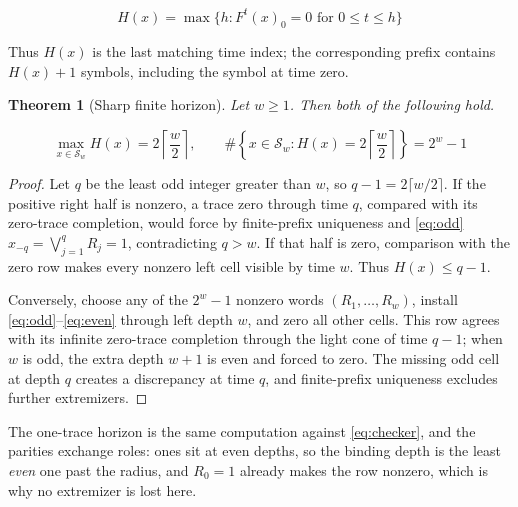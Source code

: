 \documentclass[11pt]{article}
\newtheorem{theorem}{Theorem}
\begin{document}
\begin{equation}\label{eq:horizon}
 H(x)=\max\{h:F^t(x)_0=0\text{ for }0\leq t\leq h\}
\end{equation}

Thus $H(x)$ is the last matching time index; the corresponding prefix contains
$H(x)+1$ symbols, including the symbol at time zero.

\begin{theorem}[Sharp finite horizon]\label{thm:horizon}
Let $w\geq1$.  Then both of the following hold.

\begin{equation}\label{eq:sharp}
 \max_{x\in\mathcal S_w}H(x)=2\left\lceil\frac w2\right\rceil,
 \qquad
 \#\!\left\{x\in\mathcal S_w:H(x)=2\left\lceil\frac w2\right\rceil\right\}
 =2^w-1
\end{equation}
\end{theorem}
\begin{proof}
Let $q$ be the least odd integer greater than $w$, so
$q-1=2\lceil w/2\rceil$.  If the positive right half is nonzero, a trace zero
through time $q$, compared with its zero-trace completion, would force by
finite-prefix uniqueness and \eqref{eq:odd}
$x_{-q}=\bigvee_{j=1}^qR_j=1$, contradicting $q>w$.  If that half is zero,
comparison with the zero row makes every nonzero left cell visible by time
$w$.  Thus $H(x)\leq q-1$.

Conversely, choose any of the $2^w-1$ nonzero words
$(R_1,\ldots,R_w)$, install \eqref{eq:odd}--\eqref{eq:even} through left
depth $w$, and zero all other cells.  This row agrees with its infinite
zero-trace completion through the light cone of time $q-1$; when $w$ is odd,
the extra depth $w+1$ is even and forced to zero.  The missing odd cell at
depth $q$ creates a discrepancy at time $q$, and finite-prefix uniqueness
excludes further extremizers.
\end{proof}

The one-trace horizon is the same computation against \eqref{eq:checker}, and
the parities exchange roles: ones sit at even depths, so the binding depth is
the least \emph{even} one past the radius, and $R_0=1$ already makes the row
nonzero, which is why no extremizer is lost here.
\end{document}

